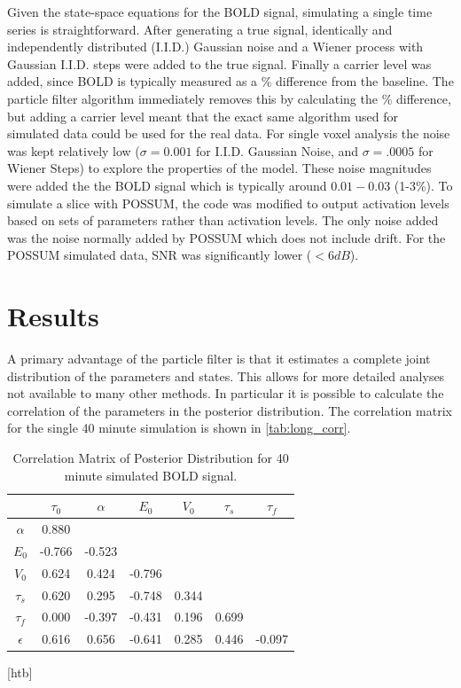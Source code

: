 \documentclass{article}
\begin{document}
Given the state-space equations for the \ac{BOLD} signal, simulating a single time
series is straightforward. After generating a true signal,
identically and independently distributed (I.I.D.) Gaussian noise and a Wiener
process with Gaussian I.I.D. steps were added to the true signal. Finally a
carrier level was added, since \ac{BOLD} is typically
measured as a \% difference from the baseline. The particle filter
algorithm immediately removes this by calculating the \% difference,
but adding a carrier level meant that the exact same algorithm used
for simulated data could be used for the real data. For single voxel
analysis the noise was kept relatively low ($\sigma = 0.001$  for
I.I.D. Gaussian Noise, and $\sigma = .0005$ for Wiener Steps) to
explore the properties of the model. These noise magnitudes were added
the the BOLD signal which is typically around $0.01-0.03$ (1-3\%). 
To simulate a slice with POSSUM, the code was modified to
output activation levels based on sets of parameters rather than
activation levels. The only noise added was the noise normally
added by POSSUM which does not include drift. 
For the POSSUM simulated data, SNR was significantly lower ($<6dB$).

\section{Results}
\label{sec:Results}
A primary advantage of the particle filter is that it estimates
a complete joint distribution of the parameters and states. This 
allows for more detailed analyses not available to many other methods.
In particular it is possible to calculate the correlation of the
parameters in the posterior distribution. The correlation matrix
for the single 40 minute simulation is shown in \autoref{tab:long_corr}.
\begin{table}[t]
\ninept
  \centering
\begin{tabular}{|c | c  c  c  c  c  c  |}
\hline
  & $\tau_0$ & $\alpha$ & $E_0$    & $V_0$    & $\tau_s$ & $\tau_f$  \\
\hline
$\alpha$                      & 0.880& & & & & \\
\rowcolor[gray]{.8} $E_0$     & -0.766& -0.523& & & & \\
$V_0$                         & 0.624& 0.424& -0.796& & & \\
\rowcolor[gray]{.8} $\tau_s$  & 0.620& 0.295& -0.748& 0.344& & \\
$\tau_f$                      & 0.000& -0.397& -0.431& 0.196& 0.699& \\
\rowcolor[gray]{.8} $\epsilon$& 0.616& 0.656& -0.641& 0.285& 0.446& -0.097\\
\hline
\end{tabular}
  \caption{Correlation Matrix of Posterior Distribution for 40 minute simulated BOLD signal.}
\label{tab:long_corr}
\end{table}[htb]
\end{document}
